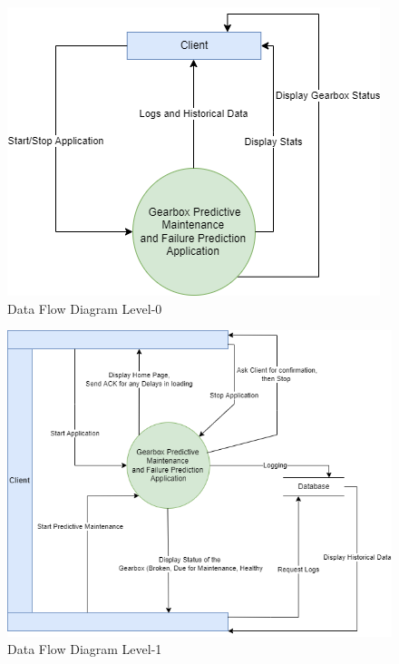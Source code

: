 \label{sec:data-flow}
\begin{figure}
	\centering
	\includegraphics[width=1.2\linewidth]{images/DataFlowDiagramLvl0.png}
	\caption{Data Flow Diagram Level-0}
\end{figure} 

\begin{figure}
	\centering
	\includegraphics[width=1.2\linewidth]{images/DataFlowDiagramLvl1.png}
	\caption{Data Flow Diagram Level-1}
\end{figure} 